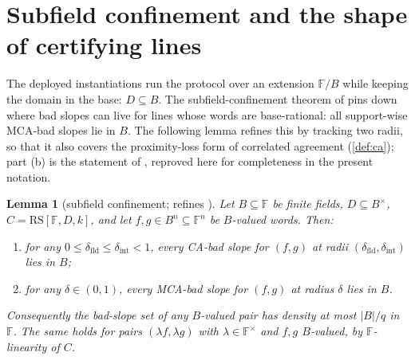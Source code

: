 \documentclass[11pt]{article}
\newtheorem{lemma}[theorem]{Lemma}
\theoremstyle{definition}
\theoremstyle{remark}
\newcommand{\F}{\mathbb{F}}
\newcommand{\B}{B}
\newcommand{\RS}{\mathrm{RS}}
\begin{document}
\section{Subfield confinement and the shape of certifying lines}\label{sec:subfield}

The deployed instantiations run the protocol over an extension $\F/\B$ while keeping the domain in the base: $D\subseteq\B$. The subfield-confinement theorem of \cite[Thm.\ ``Subfield confinement'']{Cho26b} pins down where bad slopes can live for lines whose words are base-rational: all support-wise MCA-bad slopes lie in $\B$. The following lemma refines this by tracking two radii, so that it also covers the proximity-loss form of correlated agreement (\cref{def:ca}); part (b) is the statement of \cite{Cho26b}, reproved here for completeness in the present notation.

\begin{lemma}[subfield confinement; refines {\cite{Cho26b}}]\label{lem:confine}
Let $\B\subseteq\F$ be finite fields, $D\subseteq\B^\times$, $C=\RS[\F,D,k]$, and let $f,g\in\B^n\subseteq\F^n$ be $\B$-valued words. Then:
\begin{enumerate}[label=\textup{(\alph*)}]
\item for any $0\le\delta_{\mathrm{fld}}\le\delta_{\mathrm{int}}<1$, every CA-bad slope for $(f,g)$ at radii $(\delta_{\mathrm{fld}},\delta_{\mathrm{int}})$ lies in $\B$;
\item for any $\delta\in(0,1)$, every MCA-bad slope for $(f,g)$ at radius $\delta$ lies in $\B$.
\end{enumerate}
Consequently the bad-slope set of any $\B$-valued pair has density at most $|\B|/q$ in $\F$. The same holds for pairs $(\lambda f,\lambda g)$ with $\lambda\in\F^\times$ and $f,g$ $\B$-valued, by $\F$-linearity of $C$.
\end{lemma}
\end{document}
